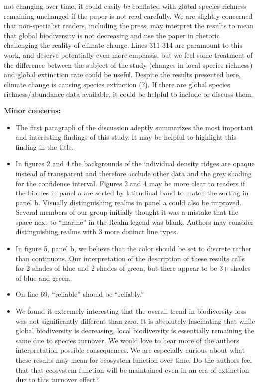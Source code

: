 \documentclass[10pt]{article}
\providecommand{\tightlist}{\setlength{\itemsep}{0pt}\setlength{\parskip}{0pt}}%
\begin{document}
\begin{itemize}
  not changing over time, it could easily be conflated with global
  species richness remaining unchanged if the paper is not read
  carefully. We are slightly concerned that non-specialist readers,
  including the press, may interpret the results to mean that global
  biodiversity is not decreasing and use the paper in rhetoric
  challenging the reality of climate change. Lines 311-314 are paramount
  to this work, and deserve potentially even more emphasis, but we feel
  some treatment of the difference between the subject of the study
  (changes in local species richness) and global extinction rate could
  be useful. Despite the results presented here, climate change is
  causing species extinction (?). If there are global species
  richness/abundance data available, it could be helpful to include or
  discuss them.
\end{itemize}

\textbf{Minor concerns:}

\begin{itemize}
\tightlist
\item
  The first paragraph of the discussion adeptly summarizes the most
  important and interesting findings of this study. It may be helpful to
  highlight this finding in the title.
\item
  In figures 2 and 4 the backgrounds of the individual density ridges
  are opaque instead of transparent and therefore occlude other data and
  the grey shading for the confidence interval. Figures 2 and 4 may be
  more clear to readers if the biomes in panel a are sorted by
  latitudinal band to match the sorting in panel b. Visually
  distinguishing realms in panel a could also be improved. Several
  members of our group initially thought it was a mistake that the space
  next to ``marine'' in the Realm legend was blank. Authors may consider
  distinguishing realms with 3 more distinct line types.
\item
  In figure 5, panel b, we believe that the color should be set to
  discrete rather than continuous. Our interpretation of the description
  of these results calls for 2 shades of blue and 2 shades of green, but
  there appear to be 3+ shades of blue and green.
\item
  On line 69, ``reliable'' should be ``reliably.''
\item
  We found it extremely interesting that the overall trend in
  biodiversity loss was not significantly different than zero. It is
  absolutely fascinating that while global biodiversity is decreasing,
  local biodiversity is essentially remaining the same due to species
  turnover. We would love to hear more of the authors interpretation
  possible consequences. We are especially curious about what these
  results may mean for ecosystem function over time. Do the authors feel
  that that ecosystem function will be maintained even in an era of
  extinction due to this turnover effect?~~
\end{itemize}
\end{document}
